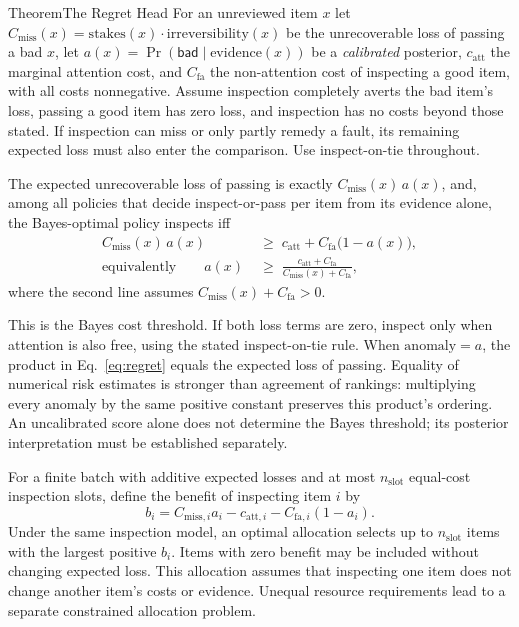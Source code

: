 \documentclass[11pt,a4paper]{article}
\theoremstyle{definition}
\theoremstyle{plain}
\begin{document}
\begin{pdclaim}{Theorem}{The Regret Head}
\setlength{\parskip}{4pt plus 1pt}
\label{thm:regret-head}
For an unreviewed item $x$ let $C_{\mathrm{miss}}(x)=\mathrm{stakes}(x)\cdot
\mathrm{irreversibility}(x)$ be the unrecoverable loss of passing a bad $x$, let
$a(x)=\Pr(\mathsf{bad}\mid\text{evidence}(x))$ be a \emph{calibrated} posterior,
$c_{\mathrm{att}}$ the marginal attention cost, and $C_{\mathrm{fa}}$ the
non-attention cost of inspecting a good item, with all costs nonnegative.
Assume inspection completely averts the bad item's loss, passing a good item
has zero loss, and inspection has no costs beyond those stated. If inspection
can miss or only partly remedy a fault, its remaining expected loss must also
enter the comparison. Use inspect-on-tie throughout.

The expected unrecoverable loss of
passing is exactly $C_{\mathrm{miss}}(x)\,a(x)$, and, among all policies that
decide inspect-or-pass per item from its evidence alone, the Bayes-optimal policy
inspects iff
\begin{equation}\label{eq:bayes-regret}
\begin{aligned}
C_{\mathrm{miss}}(x)\,a(x)&\;\ge\;c_{\mathrm{att}}+C_{\mathrm{fa}}\bigl(1-a(x)\bigr),\\
\text{equivalently}\qquad
a(x)&\;\ge\;\frac{c_{\mathrm{att}}+C_{\mathrm{fa}}}
 {C_{\mathrm{miss}}(x)+C_{\mathrm{fa}}},
\end{aligned}
\end{equation}
where the second line assumes $C_{\mathrm{miss}}(x)+C_{\mathrm{fa}}>0$.

This is the Bayes cost threshold. If both loss terms are zero, inspect only
when attention is also free, using the stated inspect-on-tie rule. When
$\mathrm{anomaly}=a$, the product in Eq.~\ref{eq:regret} equals the expected
loss of passing. Equality of numerical risk estimates is stronger than
agreement of rankings: multiplying every anomaly by the same positive
constant preserves this product's ordering. An uncalibrated score alone does
not determine the Bayes threshold; its posterior interpretation must be
established separately.

For a finite batch with additive expected losses and at most $n_{\mathrm{slot}}$ equal-cost
inspection slots, define the benefit of inspecting item $i$ by
\[
  b_i=C_{\mathrm{miss},i}a_i-c_{\mathrm{att},i}
       -C_{\mathrm{fa},i}(1-a_i).
\]
Under the same inspection model, an optimal allocation selects up to $n_{\mathrm{slot}}$
items with the largest positive $b_i$. Items with zero benefit may be included
without changing expected loss. This allocation assumes that inspecting one
item does not change another item's costs or evidence. Unequal resource
requirements lead to a separate constrained allocation problem.
\end{pdclaim}
\end{document}
